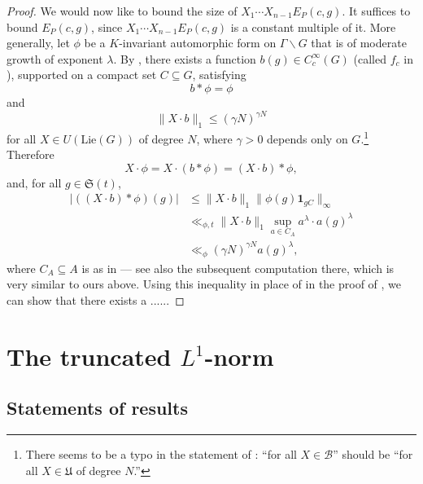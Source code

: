 \documentclass[11pt]{amsart}
\numberwithin{theorem}{section}
\numberwithin{equation}{section}
\theoremstyle{remark}
\theoremstyle{definition}
\begin{document}
{\begin{proof}
We would now like to bound the size of $X_1 \cdots X_{n-1}E_P(c,g)$. It suffices to bound $E_P(c,g)$, since $X_1 \cdots X_{n-1}E_P(c,g)$ is a constant multiple of it. More generally, let $\phi$ be a $K$-invariant automorphic form on $\Gamma \backslash G$ that is of moderate growth of exponent $\lambda$.
By \cite[Proposition A.2.4]{GMP17}, there exists a function $b(g) \in C^\infty_c(G)$ (called $f_c$ in \cite{GMP17}), supported on a compact set $C \subseteq G$, satisfying
\[b * \phi = \phi\]
and
\[\|X\cdot b\|_1 \leq (\gamma N)^{\gamma N}\]
for all $X \in U(\mathrm{Lie}(G))$ of degree $N$, where $\gamma>0$ depends only on $G$.\footnote{There seems to be a typo in the statement of \cite[Proposition A.2.3]{GMP17}: ``for all $X \in \mathcal B$'' should be ``for all $X \in \mathfrak U$ of degree $N$.''} Therefore
\begin{equation*}
X \cdot \phi = X \cdot (b * \phi) = (X \cdot b) * \phi,
\end{equation*}
and, for all $g \in \mathfrak S(t)$,
\begin{align*}
|((X \cdot b) * \phi)(g)| &\leq \|X\cdot b\|_1 \|\phi(g)\mathbf{1}_{gC}\|_\infty \\
&\ll_{\phi,t} \|X\cdot b\|_1 \sup_{a \in C_A} a^\lambda \cdot a(g)^\lambda \\
&\ll_{\phi} (\gamma N)^{\gamma N}a(g)^\lambda,
\end{align*}
where $C_A \subseteq A$ is as in \cite[Lemma 8.3.4]{Gar18} --- see also the subsequent computation there, which is very similar to ours above. Using this inequality in place of \cite[Proposition A.2.5]{GMP17} in the proof of \cite[Theorem A.3.1]{GMP17}, we can show that there exists a ......


\end{proof}
} %

\section{The truncated $L^1$-norm} \label{sec:l1}

\subsection{Statements of results}
\end{document}
